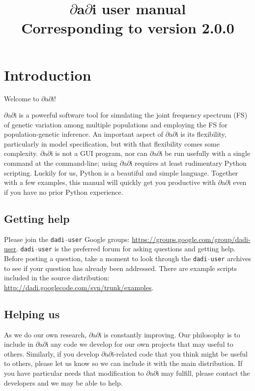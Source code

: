 \documentclass[12pt]{article}
\makeatletter
\newcommand{\dadi}{$\partial$a$\partial$i\xspace}
\newcommand{\py}[1]{\lstinline[language=Python, showstringspaces=False]@#1@}
\makeatother
\begin{document}
\title{\dadi user manual\\\normalsize  Corresponding to version 2.0.0}
\date{}
\maketitle

\tableofcontents

\clearpage

\renewcommand*{\lstlistlistingname}{Example code}
\lstlistoflistings

\clearpage

\section{Introduction}

Welcome to \dadi!

\dadi is a powerful software tool for simulating the joint frequency spectrum (FS) of genetic variation among multiple populations and employing the FS for population-genetic inference.
An important aspect of \dadi is its flexibility, particularly in model specification, but with that flexibility comes some complexity.
\dadi is not a GUI program, nor can \dadi be run usefully with a single command at the command-line; using \dadi requires at least rudimentary Python scripting.
Luckily for us, Python is a beautiful and simple language.
Together with a few examples, this manual will quickly get you productive with \dadi even if you have no prior Python experience.

\subsection{Getting help}

Please join the \py{dadi-user} Google groups: \url{https://groups.google.com/group/dadi-user}.
\py{dadi-user} is the preferred forum for asking questions and getting help.
Before posting a question, take a moment to look through the \py{dadi-user} archives to see if your question has already been addressed.
There are example scripts included in the source distribution: \url{http://dadi.googlecode.com/svn/trunk/examples}.

\subsection{Helping us}

As we do our own research, \dadi is constantly improving.
Our philosophy is to include in \dadi any code we develop for our own projects that may useful to others.
Similarly, if you develop \dadi-related code that you think might be useful to others, please let us know so we can include it with the main distribution.
If you have particular needs that modification to \dadi may fulfill, please contact the developers and we may be able to help.
\end{document}
